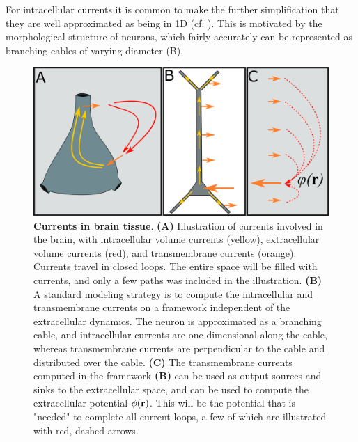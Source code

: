 For intracellular currents it is common to make the further simplification that they are well approximated as being in 1D (cf. ). This is motivated by the morphological structure of neurons, which fairly accurately can be represented as branching cables of varying diameter (B).

\begin{figure}[!ht]
\begin{center}
\includegraphics[width=1.0\textwidth]{Figures/Basics/Twostep.png}
\end{center}
\caption{{\bf Currents in brain tissue}. {\bf(A)} Illustration of currents involved in the brain, with intracellular volume currents (yellow), extracellular volume currents (red), and transmembrane currents (orange). Currents travel in closed loops. The entire space will be filled with currents, and only a few paths was included in the illustration. {\bf(B)} A standard modeling strategy is to compute the intracellular and transmembrane currents on a framework independent of the extracellular dynamics. The neuron is approximated as a branching cable, and intracellular currents are one-dimensional along the cable, whereas transmembrane currents are perpendicular to the cable and distributed over the cable. {\bf(C)} The transmembrane currents computed in the framework {\bf(B)} can be used as output sources and sinks to the extracellular space, and can be used to compute the extracellular potential $\phi({\bf r})$. This will be the potential that is "needed" to complete all current loops, a few of which are illustrated with red, dashed arrows.
}
\label{fig:Basics:Twostep}
\end{figure}


